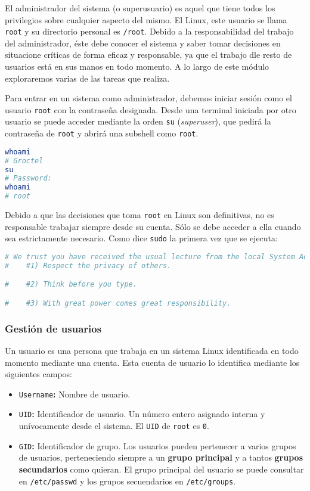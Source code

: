 El administrador del sistema (o superusuario) es aquel que tiene todos los privilegios sobre cualquier aspecto del mismo.
El Linux, este usuario se llama \texttt{root} y su directorio personal es \texttt{/root}.
Debido a la responsabilidad del trabajo del administrador, éste debe conocer el sistema y saber tomar decisiones en situacione críticas de forma eficaz y responsable, ya que el trabajo dle resto de usuarios está en sus manos en todo momento.
A lo largo de este módulo exploraremos varias de las tareas que realiza.

Para entrar en un sistema como administrador, debemos iniciar sesión como el usuario \texttt{root} con la contraseña designada.
Desde una terminal iniciada por otro usuario se puede acceder mediante la orden \texttt{su} (\emph{superuser}), que pedirá la contraseña de \texttt{root} y abrirá una subshell como \texttt{root}.

\begin{lstlisting}[language=Bash]
whoami
# Groctel
su
# Password:
whoami
# root
\end{lstlisting}

Debido a que las decisiones que toma \texttt{root} en Linux son definitivas, no es responsable trabajar siempre desde su cuenta.
Sólo se debe acceder a ella cuando sea estrictamente necesario.
Como dice \texttt{sudo} la primera vez que se ejecuta:

\begin{lstlisting}[language=Bash]
# We trust you have received the usual lecture from the local System Administrator. It usually boils down to these three things:
#    #1) Respect the privacy of others.

#    #2) Think before you type.

#    #3) With great power comes great responsibility.
\end{lstlisting}

\subsubsection{Gestión de usuarios}

Un usuario es una persona que trabaja en un sistema Linux identificada en todo momento mediante una cuenta.
Esta cuenta de usuario lo identifica mediante los siguientes campos:

\begin{itemize}
	\item\texttt{Username}\textbf{:} Nombre de usuario.
	\item\texttt{UID}\textbf{:} Identificador de usuario. Un número entero asignado interna y unívocamente desde el sistema. El \texttt{UID} de \texttt{root} es \texttt{0}.
	\item\texttt{GID}\textbf{:} Identificador de grupo. Los usuarios pueden pertenecer a varios grupos de usuarios, perteneciendo siempre a un \textbf{grupo principal} y a tantos \textbf{grupos secundarios} como quieran. El grupo principal del usuario se puede consultar en \texttt{/etc/passwd} y los grupos secuendarios en \texttt{/etc/groups}.
\end{itemize}

